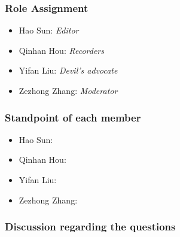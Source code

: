 		\subsubsection{Role Assignment}
		\begin{itemize}
  			\item Hao Sun: \emph{Editor}
  			\item Qinhan Hou: \emph{Recorders}
  			\item Yifan Liu: \emph{Devil’s advocate}
  			\item Zezhong Zhang: \emph{Moderator}
		\end{itemize}
		\subsubsection{Standpoint of each member}
		\begin{itemize}
  			\item Hao Sun: 
  			\item Qinhan Hou:
  			\item Yifan Liu: 
  			\item Zezhong Zhang:
		\end{itemize}
		\subsubsection{Discussion regarding the questions}
